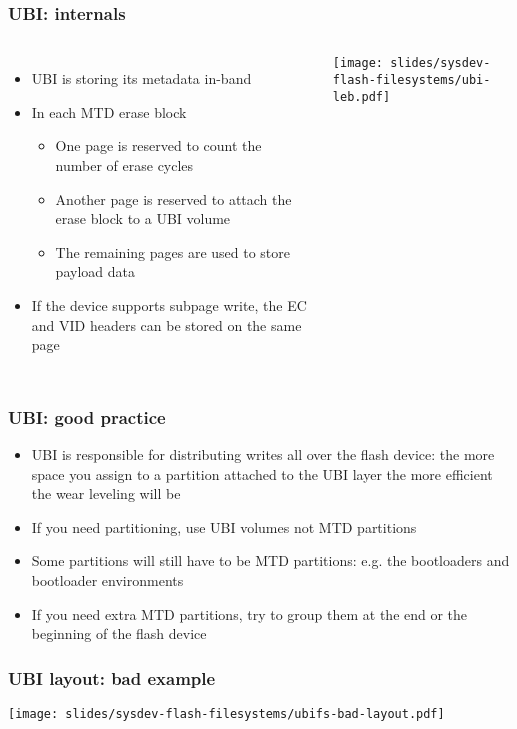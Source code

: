 \begin{frame}
  \frametitle{UBI: internals}
  \begin{columns}
    \begin{itemize}
    \item UBI is storing its metadata in-band
    \item In each MTD erase block
    \begin{itemize}
      \item One page is reserved to count the number of erase cycles
      \item Another page is reserved to attach the erase block to a
        UBI volume
      \item The remaining pages are used to store payload data
      \end{itemize}
    \item If the device supports subpage write, the EC and VID headers
      can be stored on the same page
    \end{itemize}
    \texttt{[image: slides/sysdev-flash-filesystems/ubi-leb.pdf]}
  \end{columns}
\end{frame}

\begin{frame}
  \frametitle{UBI: good practice}
  \begin{itemize}
  \item UBI is responsible for distributing writes all over the flash
    device: the more space you assign to a partition attached to the
    UBI layer the more efficient the wear leveling will be
  \item If you need partitioning, use UBI volumes not MTD partitions
  \item Some partitions will still have to be MTD partitions: e.g. the
    bootloaders and bootloader environments
  \item If you need extra MTD partitions, try to group them at the end
    or the beginning of the flash device
  \end{itemize}
\end{frame}

\begin{frame}
  \frametitle{UBI layout: bad example}
  \begin{center}
    \texttt{[image: slides/sysdev-flash-filesystems/ubifs-bad-layout.pdf]}
  \end{center}
\end{frame}

